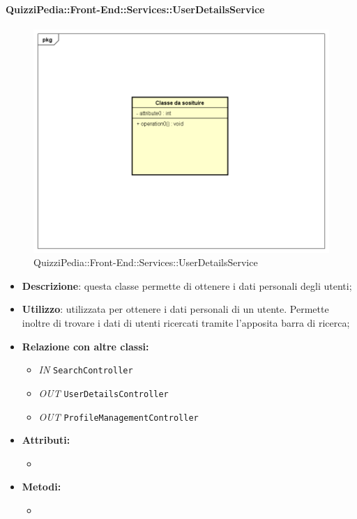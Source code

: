 \paragraph{QuizziPedia::Front-End::Services::UserDetailsService}
\begin{figure}
	\centering
	\includegraphics[scale=0.45]{UML/Classi/Front-End/Temporanea.png}
	\caption{QuizziPedia::Front-End::Services::UserDetailsService}
\end{figure}
\begin{itemize}
	\item \textbf{Descrizione}: questa classe permette di ottenere i dati personali degli utenti;
	\item \textbf{Utilizzo}: utilizzata per ottenere i dati personali di un utente. Permette inoltre di trovare i dati di utenti ricercati tramite l'apposita barra di ricerca;
	\item \textbf{Relazione con altre classi:}
	\begin{itemize}
		\item \textit{IN} \texttt{SearchController} 
		\item \textit{OUT} \texttt{UserDetailsController} 
		\item \textit{OUT} \texttt{ProfileManagementController} 
	\end{itemize}
	\item \textbf{Attributi:}
	\begin{itemize}
		\item 
	\end{itemize}
	\item \textbf{Metodi:}
	\begin{itemize}
		\item 
	\end{itemize}
\end{itemize}
